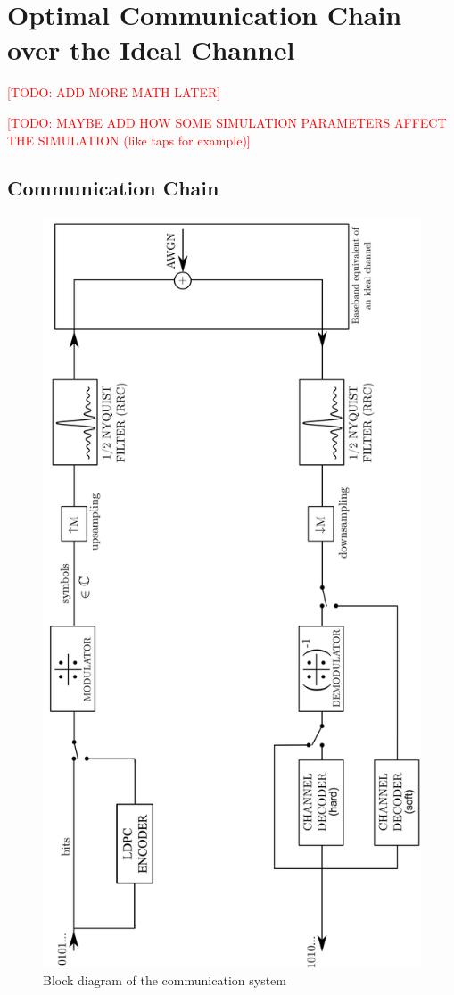 \section{Optimal Communication Chain over the Ideal Channel}
\textcolor{red}{[TODO: ADD MORE MATH LATER]}\par
\textcolor{red}{[TODO: MAYBE ADD HOW SOME SIMULATION PARAMETERS AFFECT THE SIMULATION (like taps for example)]}\\
\subsection{Communication Chain}
\begin{figure}[H]
	\centering
	\includegraphics[angle=-90, width=0.9\linewidth]{Images/com-chain}
	\caption{Block diagram of the communication system}
	\label{fig:com-chain}
\end{figure}
